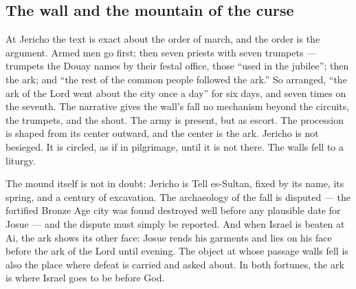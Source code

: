 \subsection{The wall and the mountain of the curse}

At Jericho the text is exact about the order of march, and the order is the
argument. Armed men go first; then seven priests with seven trumpets ---
trumpets the Douay names by their festal office, those ``used in the
jubilee''; then the ark; and ``the rest of the common people followed the
ark.'' So arranged, ``the ark of the Lord went about the city once a day''
for six days, and seven times on the seventh. The narrative gives the wall's
fall no mechanism beyond the circuits, the trumpets, and the
shout. The army is present, but as
escort. The procession is shaped from its center outward, and the center is
the ark. Jericho is not besieged. It is circled, as if in pilgrimage, until
it is not there. The walls fell to a liturgy.

The mound itself is not in doubt: Jericho is Tell es-Sultan, fixed by its
name, its spring, and a century of excavation. The archaeology of the fall
is disputed --- the fortified Bronze Age city was found destroyed well
before any plausible date for Josue --- and the dispute must simply be
reported. And when Israel is beaten at Ai, the ark shows its other face: Josue
rends his garments and lies on his face before the ark of the Lord until
evening. The object at whose
passage walls fell is also the place where defeat is carried and asked
about. In both fortunes, the ark is where Israel goes to be before God.

